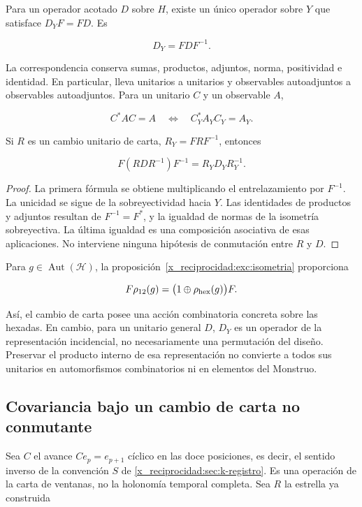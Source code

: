 \begin{theorem}
Para un operador acotado \(D\) sobre \(H\), existe un único operador sobre \(Y\) que satisface \(D_YF=FD\). Es

\[
D_Y=FDF^{-1}.
\]

La correspondencia conserva sumas, productos, adjuntos, norma, positividad e identidad. En particular, lleva unitarios a unitarios y observables autoadjuntos a observables autoadjuntos. Para un unitario \(C\) y un observable \(A\),

\[
C^*AC=A\quad\Longleftrightarrow\quad C_Y^*A_YC_Y=A_Y.
\]

Si \(R\) es un cambio unitario de carta, \(R_Y=FRF^{-1}\), entonces

\[
F(RDR^{-1})F^{-1}=R_YD_YR_Y^{-1}.
\]
\end{theorem}

\begin{proof}
La primera fórmula se obtiene multiplicando el entrelazamiento por \(F^{-1}\). La unicidad se sigue de la sobreyectividad hacia \(Y\). Las identidades de productos y adjuntos resultan de \(F^{-1}=F^*\), y la igualdad de normas de la isometría sobreyectiva. La última igualdad es una composición asociativa de esas aplicaciones. No interviene ninguna hipótesis de conmutación entre \(R\) y \(D\).
\end{proof}

Para \(g\in\operatorname{Aut}(\mathcal H)\), la proposición~\ref{x_reciprocidad:exc:isometria} proporciona

\[
F\rho_{12}(g)=\bigl(1\oplus\rho_{\rm hex}(g)\bigr)F.
\]

Así, el cambio de carta posee una acción combinatoria concreta sobre las hexadas. En cambio, para un unitario general \(D\), \(D_Y\) es un operador de la representación incidencial, no necesariamente una permutación del diseño. Preservar el producto interno de esa representación no convierte a todos sus unitarios en automorfismos combinatorios ni en elementos del Monstruo.

\subsection{Covariancia bajo un cambio de carta no conmutante}

Sea \(C\) el avance \(Ce_p=e_{p+1}\) cíclico en las doce posiciones, es decir, el sentido inverso de la convención \(S\) de \cref{x_reciprocidad:sec:k-registro}. Es una operación de la carta de ventanas, no la holonomía temporal completa. Sea \(R\) la estrella ya construida


